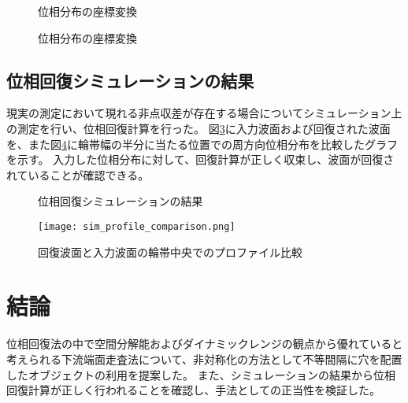 \begin{figure}[!ht]
\centering
{}
\caption[]{位相分布の座標変換}
\label{fig:unwrap_transform}
\end{figure}

\begin{figure}[!ht]
\centering
{}
\caption[]{位相分布の座標変換}
\label{fig:unwrap_path}
\end{figure}

\subsection{位相回復シミュレーションの結果}
\label{chap3_transverse_simulation_result}

現実の測定において現れる非点収差が存在する場合についてシミュレーション上の測定を行い、位相回復計算を行った。
図\ref{fig:sim_transverse}に入力波面および回復された波面を、また図\ref{fig:sim_profile_comparison}に輪帯幅の半分に当たる位置での周方向位相分布を比較したグラフを示す。
入力した位相分布に対して、回復計算が正しく収束し、波面が回復されていることが確認できる。

\begin{figure}[!ht]
\centering
{}
\caption[]{位相回復シミュレーションの結果}
\label{fig:sim_transverse}
\end{figure}

\begin{figure}[ht]
\centering
\texttt{[image: sim\_profile\_comparison.png]}
\caption{回復波面と入力波面の輪帯中央でのプロファイル比較}
\label{fig:sim_profile_comparison}
\end{figure}

\clearpage
\newpage


\section{結論}
\label{chap3_conclusion}

位相回復法の中で空間分解能およびダイナミックレンジの観点から優れていると考えられる下流端面走査法について、非対称化の方法として不等間隔に穴を配置したオブジェクトの利用を提案した。
また、シミュレーションの結果から位相回復計算が正しく行われることを確認し、手法としての正当性を検証した。


